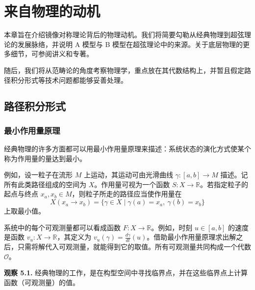 \chapter{来自物理的动机}\label{ch:physics-motivation}
本章旨在介绍镜像对称理论背后的物理动机。我们将简要勾勒从经典物理到超弦理论的发展脉络，并说明 A 模型与 B 模型在超弦理论中的来源。关于底层物理的更多细节，可参阅讲义和专著。

随后，我们将从范畴论的角度考察物理学，重点放在其代数结构上，并暂且假定路径积分形式等技术问题都能够妥善处理。

\section{路径积分形式}
\subsection{最小作用量原理}
经典物理的许多方面都可以用最小作用量原理来描述：系统状态的演化方式使某个称为作用量的量达到最小。

例如，设一粒子在流形 $M$ 上运动，其运动可由光滑曲线 $\gamma\colon[a,b]\to M$ 描述。记所有此类路径组成的空间为 $X$。作用量可视为一个函数 $S\colon X\to\mathbb R$。若指定粒子的起点与终点 $x_a,x_b\in M$，则粒子所走的路径应当使作用量在
\[
  X(x_a\to x_b)=\{\gamma\in X\mid \gamma(a)=x_a,\ \gamma(b)=x_b\}
\]
上取最小值。

系统中的每个可观测量都可以看成函数 $F\colon X\to\mathbb R$。例如，时刻 $u\in[a,b]$ 的速度是函数 $v_u\colon X\to\mathbb R$，其定义为 $v_u(\gamma)=\frac{d\gamma}{dt}(u)$。借助最小作用量原理求出解之后，只需将解代入可观测量，就能得到它的取值。所有可观测量共同构成一个代数 $\mathcal O$。

\begin{note}\label{note:classical-physics-observation}
\textbf{观察 5.1.} 经典物理的工作，是在构型空间中寻找临界点，并在这些临界点上计算函数（可观测量）的值。
\end{note}

